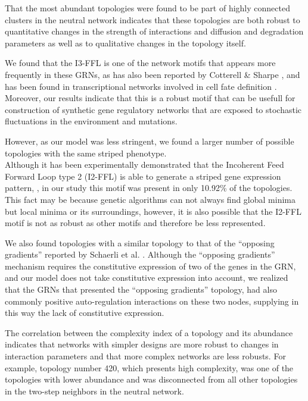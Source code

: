 \documentclass[10pt,letterpaper]{article}
\begin{document}
That the most abundant topologies were found to be part of highly connected 
clusters in the neutral network indicates that these topologies are both robust 
to quantitative changes in the strength of interactions and diffusion and 
degradation parameters as well as to qualitative changes in the topology 
itself.

We found that the I3-FFL is one of the network motifs that appears more
frequently in these GRNs, as has also been reported by Cotterell \& Sharpe
\cite{Cotterell2010}, and has been found in transcriptional networks involved 
in cell fate definition \cite{Li2019}. Moreover, our results indicate that this 
is a robust motif that can be usefull for construction of synthetic gene 
regulatory networks that are exposed to stochastic fluctuations in the 
environment and mutations.

However, as our model was less stringent, we found a larger number of possible 
topologies with the same striped phenotype.\\

Although it has been experimentally demonstrated that the Incoherent Feed 
Forward Loop type 2 (I2-FFL) is able to generate a striped gene expression 
pattern, \cite{Schaerli2014, Basu2005}, in our study this motif was present in 
only 10.92\% of the topologies. This fact may be because genetic algorithms 
can not always find global minima but local minima or its surroundings, however,
it is also possible that the I2-FFL motif is not as robust as other motifs and 
therefore be less represented.

We also found topologies with a similar topology to that of the “opposing
gradients” reported by Schaerli et al. \cite{Schaerli2018,Schaerli2014}.
Although the “opposing gradients” mechanism requires the constitutive expression
of two of the genes in the GRN, and our model does not take constitutive
expression into account, we realized that the GRNs that presented the “opposing
gradients” topology, had also commonly positive auto-regulation interactions on
these two nodes, supplying in this way the lack of constitutive expression.

The correlation between the complexity index of a topology and its abundance 
indicates that networks with simpler designs are more robust to changes in 
interaction parameters and that more complex networks are less robusts. For 
example, topology number 420, which presents high complexity, was one of the 
topologies with lower abundance and was disconnected from all other topologies 
in the two-step neighbors in the neutral network.
\end{document}
